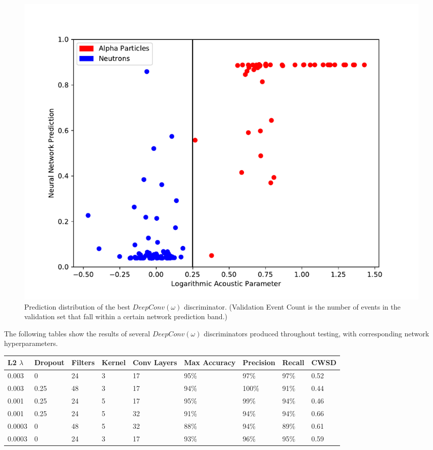 \documentclass[10pt]{article}
\begin{document}
\begin{figure}[H]
    \centering
    \includegraphics[width=\textwidth]{waveform_hist}
    \caption{\label{waveform_hist} Prediction distribution of the best $DeepConv(\omega)$ discriminator. (Validation Event Count is the number of events in the validation set that fall within a certain network prediction band.)}
\end{figure}

The following tables show the results of several $DeepConv(\omega)$ discriminators produced throughout testing, with corresponding network hyperparameters.

\begin{minipage}{\textwidth}
    \begin{center}
        \begin{tabular}{|l|l|l|l|l|l|l|l|l|}
            \hline
            L2 $\lambda$ & Dropout & Filters & Kernel & Conv Layers & Max Accuracy & Precision & Recall & CWSD \\
            \hline
            0.003 & 0 & 24 & 3 & 17 & 95\% & 97\% & 97\% & 0.52 \\
            \hline
            0.003 & 0.25 & 48 & 3 & 17 & 94\% & 100\% & 91\% & 0.44 \\
            \hline
            0.001 & 0.25 & 24 & 5 & 17 & 95\% & 99\% & 94\% & 0.46 \\
            \hline
            0.001 & 0.25 & 24 & 5 & 32 & 91\% & 94\% & 94\% & 0.66 \\
            \hline
            0.0003 & 0 & 48 & 5 & 32 & 88\% & 94\% & 89\% & 0.61 \\
            \hline
            0.0003 & 0 & 24 & 3 & 17 & 93\% & 96\% & 95\% & 0.59 \\
            \hline
        \end{tabular}
    \end{center}
\end{minipage}
\end{document}
